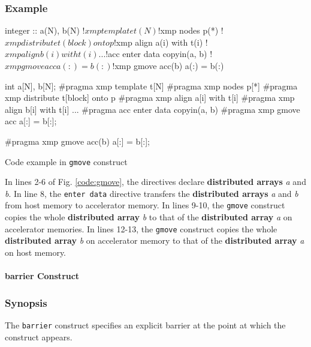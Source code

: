 \subsubsection*{Example}
\begin{myfigure}
\begin{minipage}{0.45\hsize}
\begin{center}
\begin{XACCFexampleL}
integer :: a(N), b(N)
!$xmp template t(N)
!$xmp nodes p(*)
!$xmp distribute t(block) onto p
!$xmp align a(i) with t(i)
!$xmp align b(i) with t(i)
...
!$acc enter data copyin(a, b)
!$xmp gmove acc
  a(:) = b(:)

!$xmp gmove acc(b)
  a(:) = b(:)
\end{XACCFexampleL}
\end{center}
\end{minipage}
%
\begin{minipage}{0.53\hsize}
\begin{center}
\begin{XACCCexampleR}
int a[N], b[N];
#pragma xmp template t[N]
#pragma xmp nodes p[*]
#pragma xmp distribute t[block] onto p
#pragma xmp align a[i] with t[i]
#pragma xmp align b[i] with t[i]
...
#pragma acc enter data copyin(a, b)
#pragma xmp gmove acc
  a[:] = b[:];

#pragma xmp gmove acc(b)
  a[:] = b[:];
\end{XACCCexampleR}
\end{center}
\end{minipage}
\caption{Code example in {\tt gmove} construct}\label{code:gmove}
\end{myfigure}

In lines 2-6 of Fig. \ref{code:gmove},
the directives declare {\bf distributed arrays} {\it a} and {\it b}.
In line 8,
the {\tt enter data} directive transfers the {\bf distributed arrays} {\it a} and {\it b} from host memory to accelerator memory.
In lines 9-10,
the {\tt gmove} construct copies the whole {\bf distributed array} {\it b} to
that of the {\bf distributed array} {\it a} on accelerator memories.
In lines 12-13,
the {\tt gmove} construct copies the whole {\bf distributed array} {\it b} on accelerator memory to
that of the {\bf distributed array} {\it a} on host memory.

\paragraph{barrier Construct}\label{sec:barrier}
\subsubsection*{Synopsis}
The {\tt barrier} construct specifies an explicit barrier
at the point at which the construct appears.

